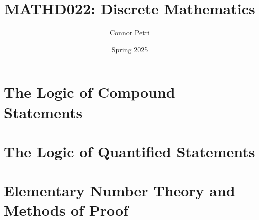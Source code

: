 \documentclass[12pt, letterpaper]{article}
\title{MATHD022: Discrete Mathematics}
\author{Connor Petri}
\date{Spring 2025}
\begin{document}
\maketitle
\pagebreak
\tableofcontents
\pagebreak





\section{The Logic of Compound Statements}




\section{The Logic of Quantified Statements}





\section{Elementary Number Theory and Methods of Proof}

\end{document}
